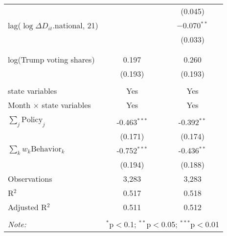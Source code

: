 \begin{tabular}{@{\extracolsep{1pt}}lcc}
  &  & (0.045) \\ 
  lag($\log \Delta D_{it}$.national, 21) &  & $-$0.070$^{**}$ \\ 
  &  & (0.033) \\ 
   &  &  \\ 
  &  &  \\ 
  log(Trump voting shares) & 0.197 & 0.260 \\ 
  & (0.193) & (0.193) \\ 
 \hline \\[-1.8ex] 
state variables & Yes & Yes \\ 
Month $\times$ state variables & Yes & Yes \\ 
\hline \\[-1.8ex] 
$\sum_j \mathrm{Policy}_j$ & -0.463$^{***}$ & -0.392$^{**}$ \\ 
 & (0.171) & (0.174) \\ 
$\sum_k w_k \mathrm{Behavior}_k$ & -0.752$^{***}$ & -0.436$^{**}$ \\ 
 & (0.194) & (0.188) \\ 
Observations & 3,283 & 3,283 \\ 
R$^{2}$ & 0.517 & 0.518 \\ 
Adjusted R$^{2}$ & 0.511 & 0.512 \\ 
\hline 
\hline \\[-1.8ex] 
\textit{Note:}  & \multicolumn{2}{r}{$^{*}$p$<$0.1; $^{**}$p$<$0.05; $^{***}$p$<$0.01} \\ 
\end{tabular} 